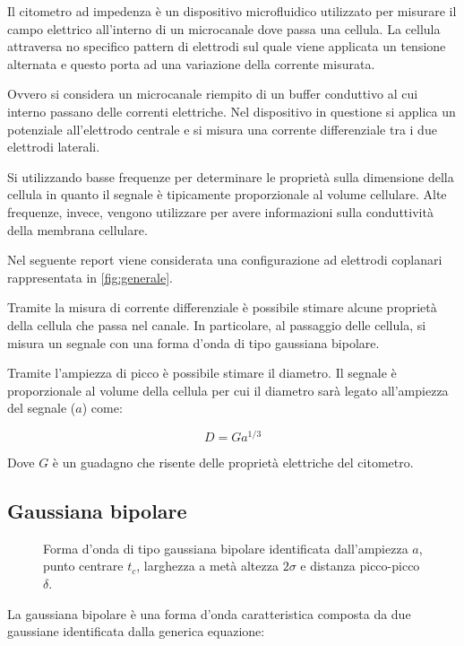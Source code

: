 Il citometro ad impedenza è un dispositivo microfluidico utilizzato per misurare il campo elettrico all'interno di un microcanale dove passa una cellula. La cellula attraversa no specifico pattern di elettrodi sul quale viene applicata un tensione alternata e questo porta ad una variazione della corrente misurata.

Ovvero si considera un microcanale riempito di un buffer conduttivo al cui interno passano delle correnti elettriche. Nel dispositivo in questione si applica un potenziale all'elettrodo centrale e si misura una corrente differenziale tra i due elettrodi laterali.

Si utilizzando basse frequenze per determinare le proprietà sulla dimensione della cellula in quanto il segnale è tipicamente proporzionale al volume cellulare. Alte frequenze, invece, vengono utilizzare per avere informazioni sulla conduttività della membrana cellulare.

Nel seguente report viene considerata una configurazione ad elettrodi coplanari rappresentata in \cref{fig:generale}.

Tramite la misura di corrente differenziale è possibile stimare alcune proprietà della cellula che passa nel canale. In particolare, al passaggio delle cellula, si misura un segnale con una forma d'onda di tipo gaussiana bipolare.

Tramite l'ampiezza di picco è possibile stimare il diametro. Il segnale è proporzionale al volume della cellula per cui il diametro sarà legato all'ampiezza del segnale ($a$) come:


\begin{equation}
	D=G a^{1 / 3}
\end{equation}

Dove $G$ è un guadagno che risente delle proprietà elettriche del citometro.

\subsection{Gaussiana bipolare}

\begin{figure}[b!]
		\centering
		\footnotesize{ \def\svgwidth{0.95\linewidth}
			}
	\caption{Forma d'onda di tipo gaussiana bipolare identificata dall'ampiezza $a$, punto centrare $t_c$, larghezza a metà altezza $2\sigma$ e distanza picco-picco $\delta$.}
	\label{fig:gaussiana}
\end{figure}


La gaussiana bipolare è una forma d'onda caratteristica composta da due gaussiane identificata dalla generica equazione:

